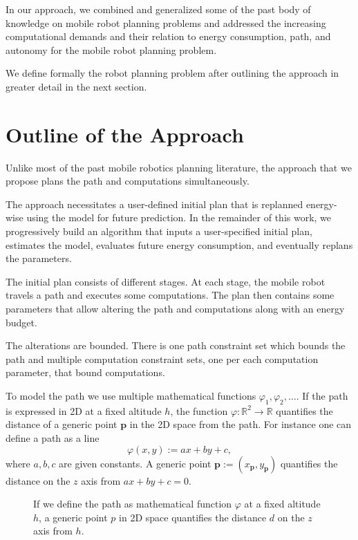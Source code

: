 In our approach, we combined and generalized some of the past body of knowledge on mobile robot planning problems and addressed the increasing computational demands and their relation to energy consumption, path, and autonomy for the mobile robot planning problem. 

We define formally the robot planning problem after outlining the approach in greater detail in the next section.


\section{Outline of the Approach}
\label{sec:outline}

Unlike most of the past mobile robotics planning literature, the approach that we propose plans the path and computations simultaneously. 

The approach necessitates a user-defined initial plan that is replanned energy-wise using the model for future prediction. In the remainder of this work, we progressively build an algorithm that inputs a user-specified initial plan, estimates the model, evaluates future energy consumption, and eventually replans the parameters. 

The initial plan consists of different stages. At each stage, the mobile robot travels a path and executes some computations. The plan then contains some parameters that allow altering the path and computations along with an energy budget.

The alterations are bounded. There is one path constraint set which bounds the path and multiple computation constraint sets, one per each computation parameter, that bound computations.

To model the path we use multiple mathematical functions $\varphi_1,\varphi_2,\dots$. If the path is expressed in 2D at a fixed altitude $h$, the function $\varphi:\mathbb{R}^2\rightarrow\mathbb{R}$ quantifies the distance of a generic point $\mathbf{p}$ in the 2D space from the path. For instance one can define a path as a line
\begin{equation}
  \varphi(x,y):=ax+by+c,
\end{equation}
where $a,b,c$ are given constants. A generic point $\mathbf{p}:=(x_{\mathbf{p}},y_{\mathbf{p}})$ quantifies the distance on the $z$ axis from $ax+by+c=0$. 

\begin{figure}[t]
  \centering
  
  \caption[Concept of the path and generic point in space]{If we define the path as mathematical function $\varphi$ at a fixed altitude $h$, a generic point $p$ in 2D space quantifies the distance $d$ on the $z$ axis from $h$.}
  \label{fig:plot1}
\end{figure}

